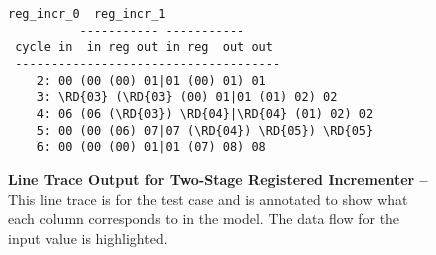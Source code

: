 
\begin{figure}

\hfill
\begin{minipage}{0.39\tw}
  \footnotesize
  \begin{Verbatim}[xleftmargin=0.1in,commandchars=\\\{\}]
          reg_incr_0  reg_incr_1
          ----------- -----------
 cycle in  in reg out in reg  out out
 -------------------------------------
    2: 00 (00 (00) 01|01 (00) 01) 01
    3: \RD{03} (\RD{03} (00) 01|01 (01) 02) 02
    4: 06 (06 (\RD{03}) \RD{04}|\RD{04} (01) 02) 02
    5: 00 (00 (06) 07|07 (\RD{04}) \RD{05}) \RD{05}
    6: 00 (00 (00) 01|01 (07) 08) 08
  \end{Verbatim}
\end{minipage}
\hfill
\begin{minipage}{0.4\tw}
  \caption{\textbf{Line Trace Output for Two-Stage Registered Incrementer
      --} This line trace is for the  test case and is
    annotated to show what each column corresponds to in the model. The
    data flow for the input value  is highlighted.}
  \label{fig-tut3-regincr-2stage-linetrace}
\end{minipage}
\hfill\mbox{}

\end{figure}

